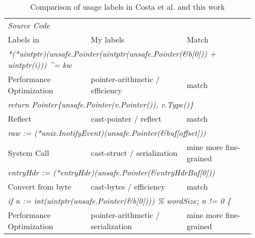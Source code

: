 \begin{table}[htp!]
    \centering
    \caption{Comparison of \unsafe{} usage labels in Costa et al. and this work}
    \label{tbl:costa-labels-comparison}
    \begin{tabularx}{\textwidth}{X|l|l}
        \toprule
        \multicolumn{3}{l}{\footnotesize\textit{Source Code}} \\
        Labels in~\cite{costa2020} & My labels                           & Match \\
        \midrule
        \multicolumn{3}{l}{\footnotesize\textit{*(*uintptr)(unsafe.Pointer(uintptr(unsafe.Pointer(\&b[0])) + uintptr(i))) \^{}= kw}} \\
        Performance Optimization   & pointer-arithmetic / efficiency     & match  \\ \hline
        \multicolumn{3}{l}{\footnotesize\textit{return Pointer\{unsafe.Pointer(v.Pointer()), v.Type()\}}} \\
        Reflect                    & cast-pointer / reflect              & match  \\ \hline
        \multicolumn{3}{l}{\footnotesize\textit{raw := (*unix.InotifyEvent)(unsafe.Pointer(\&buf[offset]))}} \\
        System Call                & cast-struct / serialization         & mine more fine-grained \\ \hline
        \multicolumn{3}{l}{\footnotesize\textit{entryHdr := (*entryHdr)(unsafe.Pointer(\&entryHdrBuf[0]))}} \\
        Convert from byte          & cast-bytes / efficiency             & match  \\ \hline
        \multicolumn{3}{l}{\footnotesize\textit{if n := int(uintptr(unsafe.Pointer(\&b[0]))) \% wordSize; n != 0 \{}} \\
        Performance Optimization   & pointer-arithmetic / serialization  & mine more fine-grained \\
        \bottomrule
    \end{tabularx}
\end{table}